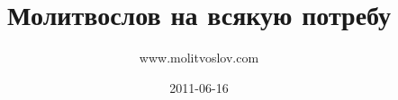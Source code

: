 \documentclass[11pt,oneside]{book}
\title{Молитвослов на всякую потребу}
\author{www.molitvoslov.com}
\date{2011-06-16}
\newcommand{\ornament}{uzor_begin_2}
\begin{document}
%

\maketitle \tableofcontents


\renewcommand{\ornament}{uzor_begin_5}




\end{document}
